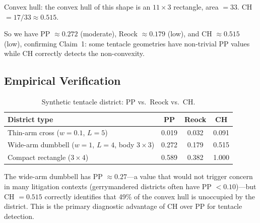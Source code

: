 Convex hull: the convex hull of this shape is an $11 \times 3$ rectangle,
area $= 33$.
CH $= 17/33 \approx 0.515$.

So we have PP $\approx 0.272$ (moderate), Reock $\approx 0.179$ (low),
and CH $\approx 0.515$ (low), confirming Claim~1: some tentacle geometries
have non-trivial PP values while CH correctly detects the non-convexity.

\subsection{Empirical Verification}

\begin{table}[ht]
\centering
\caption{Synthetic tentacle district: PP vs.\ Reock vs.\ CH.}
\label{tab:tentacle}
\begin{tabular}{lccc}
\toprule
District type & PP & Reock & CH \\
\midrule
Thin-arm cross ($w = 0.1$, $L = 5$) & 0.019 & 0.032 & 0.091 \\
Wide-arm dumbbell ($w = 1$, $L = 4$, body $3\times3$) & 0.272 & 0.179 & 0.515 \\
Compact rectangle ($3 \times 4$) & 0.589 & 0.382 & 1.000 \\
\bottomrule
\end{tabular}
\end{table}

The wide-arm dumbbell has PP $\approx 0.27$---a value that would not trigger
concern in many litigation contexts (gerrymandered districts often have
PP $< 0.10$)---but CH $= 0.515$ correctly identifies that 49\% of the
convex hull is unoccupied by the district.
This is the primary diagnostic advantage of CH over PP for tentacle detection.
